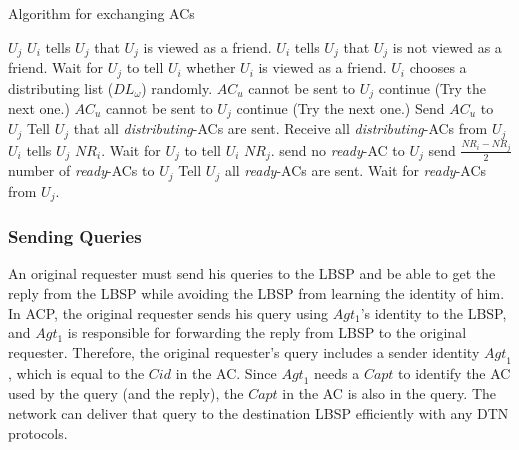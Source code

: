 \documentclass[conference]{IEEEtran}
\begin{document}
\begin{algorithm} [hbtp]
\caption{Algorithm for exchanging ACs}\label{AlgExchACs}
\begin{algorithmic}[1]
 {$U_j$}
	\State $U_i$ tells $U_j$ that $U_j$ is viewed as a friend.
\Else
	\State $U_i$ tells $U_j$ that $U_j$ is not viewed as a friend.
\EndIf
\State Wait for $U_j$ to tell $U_i$ whether $U_i$ is viewed as a friend.
\State $U_i$ chooses a distributing list (${DL}_{\omega}$) randomly.
		\State ${AC}_u$ cannot be sent to $U_j$
		\State continue (Try the next one.)
	\EndIf
			\State ${AC}_u$ cannot be sent to $U_j$
			\State continue (Try the next one.)
		\EndIf
	\EndIf
	\State Send ${AC}_u$ to $U_j$
\EndFor
\State Tell $U_j$ that all \textit{distributing}-ACs are sent.
\State Receive all \textit{distributing}-ACs from $U_j$
	\State $U_i$ tells $U_j$ ${NR}_i$.
\EndIf
{}
	\State Wait for $U_j$ to tell $U_i$ ${NR}_j$.
		\State send no \textit{ready}-AC to $U_j$
	\Else
		\State send $\frac{{NR}_i-{NR}_j}{2}$ number of \textit{ready}-ACs to $U_j$
	\EndIf
	\State Tell $U_j$ all \textit{ready}-ACs are sent.
\EndIf
{}
	\State Wait for \textit{ready}-ACs from $U_j$.
\EndIf 
\EndProcedure

\end{algorithmic}
\end{algorithm}

\subsubsection{ Sending Queries}

An original requester must send his queries to the LBSP and be able to get the reply from the LBSP while avoiding the LBSP from learning the identity of him. In ACP, the original requester sends his query using $Agt_1$'s identity to the LBSP, and $Agt_1$ is responsible for forwarding the reply from LBSP to the original requester. Therefore, the original requester's query includes a sender identity ${Agt}_1$, which is equal to the $Cid$ in the AC. Since ${Agt}_1$ needs a ${Capt}$ to identify the AC used by the query (and the reply), the ${Capt}$ in the AC is also in the query. The network can deliver that query to the destination LBSP efficiently with any DTN protocols.
\end{document}
